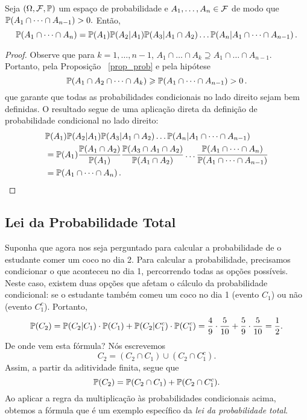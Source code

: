 \begin{proposition}
Seja $(\Omega,\mathcal F,\mathbb{P})$ um espaço de probabilidade e $A_1, \dots, A_n \in \mathcal F$ de modo que $\mathbb{P}(A_1 \cap \dots \cap A_{n-1})>0.$ Então,
\begin{equation}
\mathbb{P}(A_1 \cap \dots \cap A_n) = \mathbb{P}(A_1)\mathbb{P}(A_2|A_1)\mathbb{P}(A_3|A_1\cap A_2)
\dots \mathbb{P}(A_n|A_1 \cap \dots \cap A_{n-1}) \,.
\end{equation}
\end{proposition}

\begin{proof}
Observe que para $k=1,\dots,n-1$, $A_1 \cap \dots \cap A_k \supseteq A_1 \cap \dots \cap A_{n-1}.$ Portanto, pela Proposição ~\ref{prop_prob} e pela hipótese
\begin{equation}
\mathbb{P}(A_1 \cap A_2 \cap \dots \cap A_k) \geqslant \mathbb{P}(A_1 \cap \dots \cap A_{n-1}) >0 \,.
\end{equation}
que garante que todas as probabilidades condicionais no lado direito sejam bem definidas. O resultado segue de uma aplicação direta da definição de probabilidade condicional no lado direito:
\begin{align}
&\mathbb{P}(A_1) \mathbb{P}(A_2|A_1)\mathbb{P}(A_3|A_1 \cap A_2) \dots \mathbb{P}(A_n|A_1 \cap \dots \cap A_{n-1}) \\
&=\mathbb{P}(A_1) \frac{\mathbb{P}(A_1 \cap A_2)}{\mathbb{P}(A_1)} \frac{\mathbb{P}(A_3 \cap A_1 \cap A_2)}{\mathbb{P}(A_1 \cap A_2)} \dots \frac{\mathbb{P}(A_1 \cap \dots \cap A_n)}{\mathbb{P}(A_1\cap \dots \cap A_{n-1})} \\
&=\mathbb{P}(A_1 \cap \dots \cap A_n) \,.
\qedhere
\end{align}
\end{proof}

\subsection{Lei da Probabilidade Total}

\begin{example}
    Suponha que agora nos seja perguntado para calcular a probabilidade de o estudante comer um coco no dia 2. Para calcular a probabilidade, precisamos condicionar o que aconteceu no dia 1, percorrendo todas as opções possíveis. Neste caso, existem duas opções que afetam o cálculo da probabilidade condicional: se o estudante também comeu um coco no dia 1 (evento $C_1$) ou não (evento $C_1^c$). Portanto,
    \[
\mathbb{P}(C_2) = \mathbb{P}(C_2|C_1) \cdot \mathbb{P} (C_1) + \mathbb{P}(C_2|C_1^c) \cdot\mathbb{P}(C_1^c) = \frac{4}{9}\cdot\frac{5}{10}+\frac{5}{9}\cdot\frac{5}{10} = \frac{1}{2}.
    \]
    De onde vem esta fórmula? Nós escrevemos
    \[ C_2 = (C_2\cap C_1)\cup (C_2\cap C_1^c). \]
    Assim, a partir da aditividade finita, segue que
    \[ \mathbb{P}(C_2) = \mathbb{P}(C_2\cap C_1) + \mathbb{P}(C_2\cap C_1^c).\]
    Ao aplicar a regra da multiplicação às probabilidades condicionais acima, obtemos a fórmula que é um exemplo específico da {\it lei da probabilidade total}.
\end{example}


